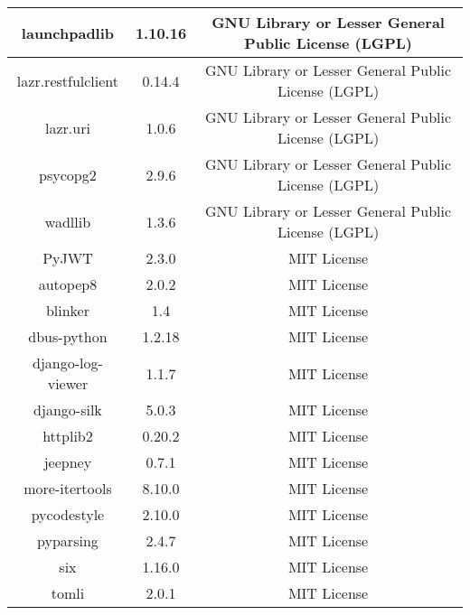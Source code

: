 \begin{table}[ht]
{\begin{tabular}{|c|c|c|}
launchpadlib        & 1.10.16          & GNU Library or Lesser General Public License (LGPL)     \\ \hline
lazr.restfulclient  & 0.14.4           & GNU Library or Lesser General Public License (LGPL)     \\ \hline
lazr.uri            & 1.0.6            & GNU Library or Lesser General Public License (LGPL)     \\ \hline
psycopg2            & 2.9.6            & GNU Library or Lesser General Public License (LGPL)     \\ \hline
wadllib             & 1.3.6            & GNU Library or Lesser General Public License (LGPL)     \\ \hline
PyJWT               & 2.3.0            & MIT License                                             \\ \hline
autopep8            & 2.0.2            & MIT License                                             \\ \hline
blinker             & 1.4              & MIT License                                             \\ \hline
dbus-python         & 1.2.18           & MIT License                                             \\ \hline
django-log-viewer   & 1.1.7            & MIT License                                             \\ \hline
django-silk         & 5.0.3            & MIT License                                             \\ \hline
httplib2            & 0.20.2           & MIT License                                             \\ \hline
jeepney             & 0.7.1            & MIT License                                             \\ \hline
more-itertools      & 8.10.0           & MIT License                                             \\ \hline
pycodestyle         & 2.10.0           & MIT License                                             \\ \hline
pyparsing           & 2.4.7            & MIT License                                             \\ \hline
six                 & 1.16.0           & MIT License                                             \\ \hline
tomli               & 2.0.1            & MIT License                                             \\ \hline

\end{tabular}}
\end{table}
